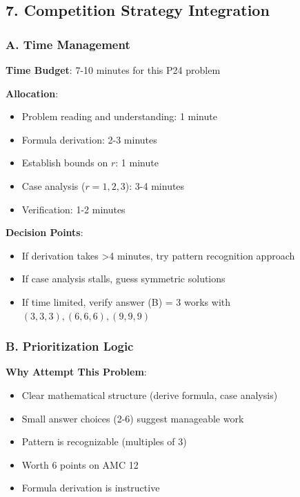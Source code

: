 \documentclass[12pt]{article}
\begin{document}
\begin{competitionbox}
\subsection*{7. Competition Strategy Integration}

\subsubsection*{A. Time Management}

\textbf{Time Budget}: 7-10 minutes for this P24 problem

\textbf{Allocation}:
\begin{itemize}
    \item Problem reading and understanding: 1 minute
    \item Formula derivation: 2-3 minutes
    \item Establish bounds on $r$: 1 minute
    \item Case analysis ($r = 1, 2, 3$): 3-4 minutes
    \item Verification: 1-2 minutes
\end{itemize}

\textbf{Decision Points}:
\begin{itemize}
    \item If derivation takes >4 minutes, try pattern recognition approach
    \item If case analysis stalls, guess symmetric solutions
    \item If time limited, verify answer (B) = 3 works with $(3,3,3), (6,6,6), (9,9,9)$
\end{itemize}

\subsubsection*{B. Prioritization Logic}

\textbf{Why Attempt This Problem}:
\begin{itemize}
    \item Clear mathematical structure (derive formula, case analysis)
    \item Small answer choices (2-6) suggest manageable work
    \item Pattern is recognizable (multiples of 3)
    \item Worth 6 points on AMC 12
    \item Formula derivation is instructive
\end{itemize}


\end{competitionbox}
\end{document}
